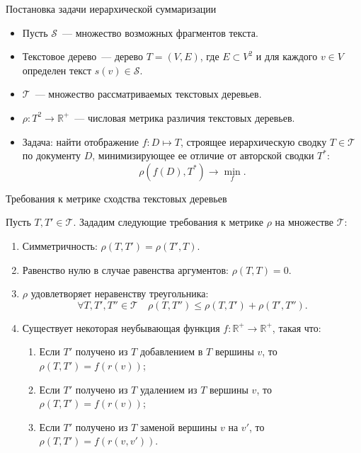 \documentclass{beamer}
\newcommand{\R}{\mathbb{R}}
\begin{document}

\begin{frame}{Постановка задачи иерархической суммаризации}

\begin{itemize}
    \item Пусть $\mathcal{S}$~--- множество возможных фрагментов текста. \item Текстовое дерево~--- дерево $T = (V, E)$, где $E \subset V^2$ и для каждого $v\in V$ определен текст $s(v)\in\mathcal{S}$. 
    \item $\mathcal{T}$~--- множество рассматриваемых текстовых деревьев.
    \item $\rho: T^2\rightarrow\R^+$~--- числовая метрика различия текстовых деревьев.
    \item Задача: найти отображение $f: D\mapsto T$, строящее иерархическую сводку $T\in\mathcal{T}$ по документу $D$, минимизирующее ее отличие от авторской сводки $T^*$:
    $$
    \rho(f(D), T^*)\longrightarrow\min_f.
    $$
\end{itemize}

\end{frame}


\begin{frame}{Требования к метрике сходства текстовых деревьев}

Пусть $T, T' \in\mathcal{T}$. Зададим следующие требования к метрике $\rho$ на множестве $\mathcal{T}$:
\begin{enumerate}
    \item Симметричность: $\rho(T, T') = \rho(T', T)$.
    \item Равенство нулю в случае равенства аргументов: $\rho(T, T) = 0$.  
    \item $\rho$ удовлетворяет неравенству треугольника: 
    \begin{equation} \label{metric_requirement_6}
        \forall T, T', T''\in\mathcal{T}\quad \rho(T,T'')\leq\rho(T,T')+\rho(T',T'').
    \end{equation}
    \item Существует некоторая неубывающая функция $f: \R^+ \rightarrow \R^+$, такая что:
    \begin{enumerate}
        \item Если $T'$ получено из $T$ добавлением в $T$ вершины $v$, то $\rho(T, T') = f(r(v))$;
        \item Если $T'$ получено из $T$ удалением из $T$ вершины $v$, то $\rho(T, T') = f(r(v))$;
        \item Если $T'$ получено из $T$ заменой вершины $v$ на $v'$, то $\rho(T, T')= f(r(v, v'))$.
    \end{enumerate}
\end{enumerate}

\end{frame}
\end{document}
